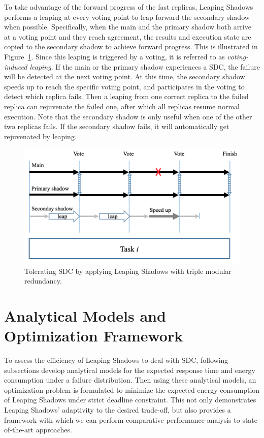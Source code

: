 To take advantage of the forward progress of the fast replicas, Leaping Shadows performs a leaping at every voting point to leap forward the secondary shadow when possible. Specifically, when the main and the primary shadow both arrive at a voting point and they reach  agreement, the results and execution state are copied to the secondary shadow to achieve forward progress. This is illustrated in Figure~\ref{fig:silent_model}. Since this leaping is triggered by a voting, it is referred to as \textit{voting-induced leaping}. If the main or the primary shadow experiences a SDC, the failure will be detected at the next voting point. At this time, the secondary shadow speeds up to reach the specific voting point, and participates in the voting to detect which replica fails. Then a leaping from one correct replica to the failed replica can rejuvenate the failed one, after which all replicas resume normal execution. Note that the secondary shadow is only useful when one of the other two replicas fails. If the secondary shadow fails, it will automatically get rejuvenated by leaping. 

\begin{figure}[!h]
  \begin{center}
      \includegraphics[width=0.8\columnwidth]{Figures/silent_model}
  \end{center}
  \caption{Tolerating SDC by applying Leaping Shadows with triple modular redundancy.}
  \label{fig:silent_model}
\end{figure}


\section{Analytical Models and Optimization Framework}
To assess the efficiency of Leaping Shadows to deal with SDC, following subsections develop analytical models for the expected response time and energy consumption under a failure distribution. Then using these analytical models, an optimization problem is formulated to minimize the expected energy consumption of Leaping Shadows under strict deadline constraint. This not only demonstrates Leaping Shadows' adaptivity to the desired trade-off, but also provides a framework with which we can perform comparative performance analysis to state-of-the-art approaches.

